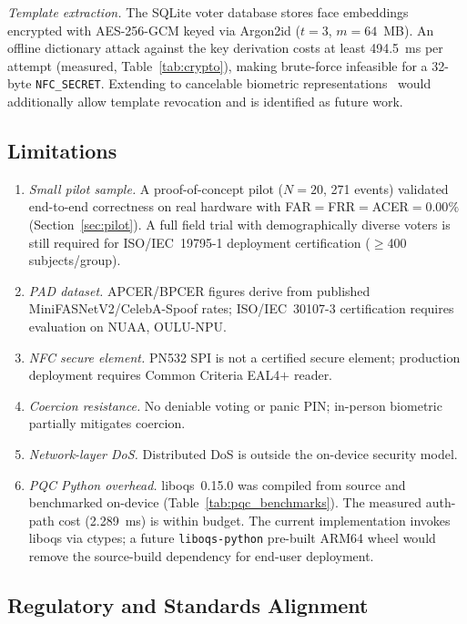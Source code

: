 \documentclass[conference]{IEEEtran}
\begin{document}
\textit{Template extraction.} The SQLite voter database stores face embeddings
encrypted with AES-256-GCM keyed via Argon2id (\(t{=}3\), \(m{=}64\)~MB).
An offline dictionary attack against the key derivation costs at least
494.5~ms per attempt (measured, Table~\ref{tab:crypto}), making brute-force
infeasible for a 32-byte \texttt{NFC\_SECRET}. Extending to cancelable
biometric representations~\cite{jain2008cancelable} would additionally
allow template revocation and is identified as future work.

\subsection{Limitations}
\label{sec:limitations}

\begin{enumerate}
  \item \textit{Small pilot sample.} A proof-of-concept pilot (\(N{=}20\),
    271 events) validated end-to-end correctness on real hardware with
    FAR\(=\)FRR\(=\)ACER\(=0.00\%\) (Section~\ref{sec:pilot}). A full
    field trial with demographically diverse voters is still required for
    ISO/IEC~19795-1 deployment certification (\(\geq\)400 subjects/group).
  \item \textit{PAD dataset.} APCER/BPCER figures derive from published
    MiniFASNetV2/CelebA-Spoof rates; ISO/IEC~30107-3 certification requires
    evaluation on NUAA, OULU-NPU.
  \item \textit{NFC secure element.} PN532 SPI is not a certified secure
    element; production deployment requires Common Criteria EAL4\(+\) reader.
  \item \textit{Coercion resistance.} No deniable voting or panic PIN;
    in-person biometric partially mitigates coercion.
  \item \textit{Network-layer DoS.} Distributed DoS is outside the on-device
    security model.
  \item \textit{PQC Python overhead.} liboqs~0.15.0 was compiled from
    source and benchmarked on-device (Table~\ref{tab:pqc_benchmarks}).
    The measured auth-path cost (2.289~ms) is within budget. The current
    implementation invokes liboqs via ctypes; a future \texttt{liboqs-python}
    pre-built ARM64 wheel would remove the source-build dependency for
    end-user deployment.
\end{enumerate}

\subsection{Regulatory and Standards Alignment}
\label{sec:regulatory}
\end{document}
